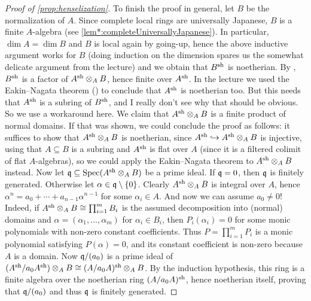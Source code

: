 \begin{proof}[Proof of \cref{prop:henselization}]
	To finish the proof in general, let $B$ be the normalization of $A$. Since complete local rings are universally Japanese, $B$ is a finite $A$-algebra (see \cref{lem*:completeUniversallyJapanese}). In particular, $\dim A=\dim B$ and $B$ is local again by going-up, hence the above inductive argument works for $B$ (doing induction on the dimension spares us the somewhat delicate argument from the lecture) and we obtain that $B^{\mathrm{sh}}$ is noetherian. By , $B^{\mathrm{sh}}$ is a factor of $A^{\mathrm{sh}}\otimes_AB$, hence finite over $A^{\mathrm{sh}}$. In the lecture we used the Eakin--Nagata theorem (\cite[Theorem~3.7]{matsumuraCRT}) to conclude that $A^{\mathrm{sh}}$ is noetherian too. But this needs that $A^{\mathrm{sh}}$ is a subring of $B^{\mathrm{sh}}$, and I really don't see why that should be obvious. So we use a workaround here. We claim that $A^{\mathrm{sh}}\otimes_AB$ is a finite product of normal domains. If that was shown, we could conclude the proof as follows: it suffices to show that $A^{\mathrm{sh}}\otimes_AB$ is noetherian, since $A^\sh\monomorphism A^\sh\otimes_AB$ is injective, using that $A\subseteq B$ is a subring and $A^{\mathrm{sh}}$ is flat over $A$ (since it is a filtered colimit of flat $A$-algebras), so we could apply the Eakin--Nagata theorem to $A^{\mathrm{sh}}\otimes_AB$ instead. Now let $\mathfrak{q}\subseteq \operatorname{Spec} (A^{\mathrm{sh}}\otimes_AB)$ be a prime ideal. If $\mathfrak{q}=0$, then $\mathfrak{q}$ is finitely generated. Otherwise let $\alpha\in \mathfrak{q}\setminus\{0\}$. Clearly $A^{\mathrm{sh}}\otimes_AB$ is integral over $A$, hence $\alpha^n=a_0+\dotsb+a_{n-1}\alpha^{n-1}$ for some $\alpha_i\in A$. And now we can assume $a_0\neq 0$! Indeed, if $A^{\mathrm{sh}}\otimes_AB\cong \prod_{i=1}^mB_i$ is the assumed decomposition into (normal) domains and $\alpha=(\alpha_1,\dotsc,\alpha_m)$ for $\alpha_i\in B_i$, then $P_i(\alpha_i)=0$ for some monic polynomials with non-zero constant coefficients. Thus $P=\prod_{i=1}^mP_i$ is a monic polynomial satisfying $P(\alpha)=0$, and its constant coefficient is non-zero because $A$ is a domain. Now $\mathfrak{q}/(a_0)$ is a prime ideal of $(A^{\mathrm{sh}}/a_0A^{\mathrm{sh}})\otimes_AB\cong (A/a_0A)^{\mathrm{sh}}\otimes_AB$. By the induction hypothesis, this ring is a finite algebra over the noetherian ring $(A/a_0A)^{\mathrm{sh}}$, hence noetherian itself, proving that $\mathfrak{q}/(a_0)$ and thus $\mathfrak{q}$ is finitely generated.
	

\end{proof}
